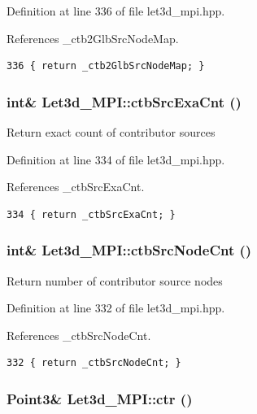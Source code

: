 Definition at line 336 of file let3d\_\-mpi.hpp.

References \_\-ctb2Glb\-Src\-Node\-Map.

\footnotesize\begin{verbatim}336 { return _ctb2GlbSrcNodeMap; }
\end{verbatim}\normalsize 


\subsubsection{\setlength{\rightskip}{0pt plus 5cm}int\& Let3d\_\-MPI::ctb\-Src\-Exa\-Cnt ()\hspace{0.3cm}{\tt  [inline]}}\label{classLet3d__MPI_ef9a057fecc402d5d641067c9a43d7af_ef9a057fecc402d5d641067c9a43d7af}


Return exact count of contributor sources 

Definition at line 334 of file let3d\_\-mpi.hpp.

References \_\-ctb\-Src\-Exa\-Cnt.

\footnotesize\begin{verbatim}334 { return _ctbSrcExaCnt; }
\end{verbatim}\normalsize 


\subsubsection{\setlength{\rightskip}{0pt plus 5cm}int\& Let3d\_\-MPI::ctb\-Src\-Node\-Cnt ()\hspace{0.3cm}{\tt  [inline]}}\label{classLet3d__MPI_a558f7790d074c6bf0478d3d3300e595_a558f7790d074c6bf0478d3d3300e595}


Return number of contributor source nodes 

Definition at line 332 of file let3d\_\-mpi.hpp.

References \_\-ctb\-Src\-Node\-Cnt.

\footnotesize\begin{verbatim}332 { return _ctbSrcNodeCnt; }
\end{verbatim}\normalsize 


\subsubsection{\setlength{\rightskip}{0pt plus 5cm}Point3\& Let3d\_\-MPI::ctr ()\hspace{0.3cm}{\tt  [inline]}}\label{classLet3d__MPI_4b21bb4fef46b29bb3fb644f97b12415_4b21bb4fef46b29bb3fb644f97b12415}



